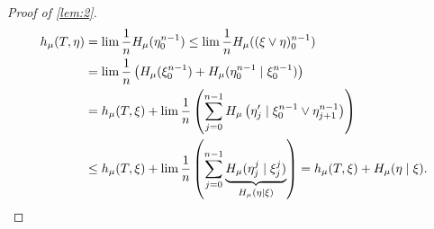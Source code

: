 \documentclass{article}
\begin{document}
\begin{proof}[Proof of \cref{lem:2}]
  \begin{align*}
    h_\mu(T, \eta) &= \lim \frac{1}{n} H_\mu(\eta_0^{n-1}) \leq \lim \frac{1}{n} H_\mu((\xi \vee \eta)_0^{n-1})  \\
                   &= \lim \frac{1}{n} \left(H_\mu(\xi_0^{n-1}) + H_\mu(\eta_0^{n-1} \mid \xi_0^{n-1})\right) \\
                   &= h_\mu(T, \xi) + \lim \frac{1}{n} \left(\sum_{j=0}^{n-1} H_\mu\left(\eta_j' \mid \xi_0^{n-1} \vee \eta_{j+1}^{n-1}\right)\right) \\
                   &\leq h_\mu(T,\xi) + \lim \frac{1}{n} \left(\sum_{j=0}^{n-1} \underbrace{H_\mu(\eta_j^j \mid \xi_j^j)}_{H_\mu(\eta \mid \xi)}\right) = h_\mu(T,\xi) + H_\mu(\eta \mid \xi). \qedhere
  \end{align*}
\end{proof}
\color{gray}
\end{document}
